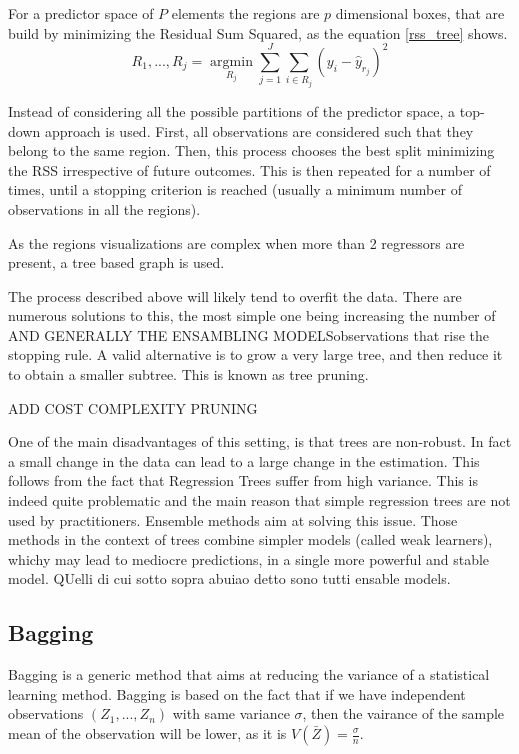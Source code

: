 \documentclass[a4paper,11pt]{article}
\begin{document}
For a predictor space of $P$ elements the regions are $p$ dimensional boxes, that are build by minimizing the Residual Sum Squared, as the equation \ref{rss_tree} shows.
\begin{equation}
  R_1,...,R_j=\operatorname*{argmin}_{R_j}\sum^J_{j=1}\sum_{i\in R_j}\left(y_i-\hat{y}_{r_j}\right)^2
  \label{rss_tree}
\end{equation}

Instead of considering all the possible partitions of the predictor space, a top-down approach is used. First, all observations are considered such that they belong to the same region. Then, this process chooses the best split minimizing the RSS irrespective of future outcomes. This is then repeated for a number of times, until a stopping criterion is reached (usually a minimum number of observations in all the regions).

As the regions visualizations are complex when more than 2 regressors are present, a tree based graph is used.

The process described above will likely tend to overfit the data. There are numerous solutions to this, the most simple one being increasing the number of AND GENERALLY THE ENSAMBLING MODELSobservations that rise the stopping rule. A valid alternative is to grow a very large tree, and then reduce it to obtain a smaller subtree. This is known as tree pruning.  

ADD COST COMPLEXITY PRUNING

One of the main disadvantages of this setting, is that trees are non-robust. In fact a small change in the data can lead to a large change in the estimation. This follows from the fact that Regression Trees suffer from high variance. This is indeed quite problematic and the main reason that simple regression trees are not used by practitioners. Ensemble methods aim at solving this issue. Those methods in the context of trees combine simpler models (called weak learners), whichy may lead to mediocre predictions, in a single more powerful and stable model. QUelli di cui sotto sopra abuiao detto sono tutti ensable models.

\subsection{Bagging}
Bagging is a generic method that aims at reducing the variance of a statistical learning method. Bagging is based on the fact that if we have independent observations $(Z_1,...,Z_n)$ with same variance $\sigma$, then the vairance of the sample mean of the observation will be lower, as it is $V(\bar{Z})=\frac{\sigma}{n}$.
\end{document}
